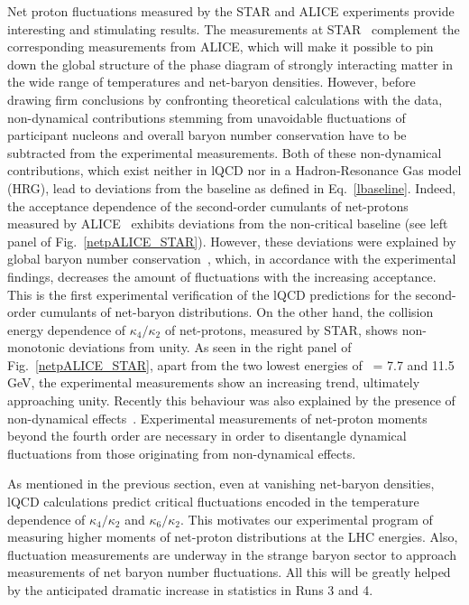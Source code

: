 Net proton fluctuations measured by the STAR and ALICE experiments provide interesting and stimulating results. The measurements at STAR~\cite{Adamczyk:2013dal} complement the corresponding measurements from ALICE, which will make it possible to pin down the global structure of the phase diagram of strongly interacting matter in the wide range of temperatures and net-baryon densities. However, before drawing firm conclusions by confronting theoretical calculations with the data, non-dynamical contributions stemming from unavoidable fluctuations of  participant nucleons and  overall baryon number conservation have to be subtracted from the experimental measurements. Both of these non-dynamical contributions, which exist neither in lQCD nor in a Hadron-Resonance Gas model (HRG), lead to deviations from the baseline as defined in Eq.~\ref{lbaseline}. Indeed, the acceptance dependence of the second-order cumulants of net-protons measured by ALICE~\cite{Rustamov:2017lio} exhibits deviations from the non-critical baseline (see left panel of Fig.~\ref{netpALICE_STAR}). However, these deviations were explained by global baryon number conservation~\cite{Rustamov:2017lio, Braun-Munzinger:2016yjz, Braun-Munzinger:2018yru}, which, in accordance with the experimental findings, decreases the amount of fluctuations with the increasing acceptance. This is the first experimental verification of the lQCD predictions for the second-order cumulants of net-baryon distributions. On the other hand, the collision energy dependence of $\kappa_{4}/\kappa_{2}$ of net-protons, measured by STAR, shows non-monotonic deviations from unity. As seen in the right panel of Fig.~\ref{netpALICE_STAR}, apart from the two lowest energies of \sqrtsNN~= 7.7 and 11.5 GeV, the experimental measurements show an increasing trend, ultimately approaching unity. Recently this behaviour was also explained by the presence of non-dynamical effects~\cite{Braun-Munzinger:2018yru}. Experimental measurements of net-proton moments beyond the fourth order are necessary in order to disentangle dynamical fluctuations from those originating from non-dynamical effects.

As mentioned in the previous section, even at vanishing net-baryon densities, lQCD calculations predict critical fluctuations encoded in the temperature dependence of $\kappa_{4}/\kappa_{2}$ and $\kappa_{6}/\kappa_{2}$. This motivates our experimental program  of measuring higher moments of net-proton distributions at the LHC energies. Also, fluctuation measurements  are underway in the strange baryon sector to approach measurements of net baryon number fluctuations. All this will be greatly helped by the anticipated dramatic increase in statistics in Runs 3 and 4.

